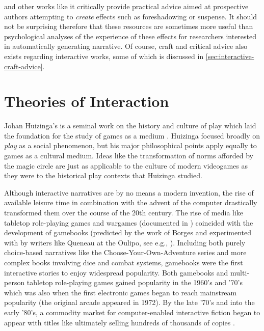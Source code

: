  and other works like it critically provide practical advice aimed at prospective authors attempting to \emph{create} effects such as foreshadowing or suspense.
%
It should not be surprising therefore that these resources are sometimes more useful than psychological analyses of the experience of these effects for researchers interested in automatically generating narrative.
%
Of course, craft and critical advice also exists regarding interactive works, some of which is discussed in \cref{sec:interactive-craft-advice}.


\section{Theories of Interaction}

Johan Huizinga's  is a seminal work on the history and culture of play which laid the foundation for the study of games as a medium \citep{Huizinga1949}.
%
Huizinga focused broadly on \emph{play} as a social phenomenon, but his major philosophical points apply equally to games as a cultural medium.
%
Ideas like the transformation of norms afforded by the magic circle are just as applicable to the culture of modern videogames as they were to the historical play contexts that Huizinga studied.


Although interactive narratives are by no means a modern invention, the rise of available leisure time in combination with the advent of the computer drastically transformed them over the course of the 20th century.
%
The rise of media like tabletop role-playing games and wargames (documented in \citep{Peterson2012}) coincided with the development of gamebooks (predicted by the work of Borges \citep{Borges1956} and experimented with by writers like Queneau at the Oulipo, see e.g., \citep{Queneau1967}).
%
Including both purely choice-based narratives like the Choose-Your-Own-Adventure series and more complex books involving dice and combat systems, gamebooks were the first interactive stories to enjoy widespread popularity.
%
Both gamebooks and multi-person tabletop role-playing games gained popularity in the 1960's and '70's which was also when the first electronic games began to reach mainstream popularity (the original arcade  appeared in 1972).
%
By the late '70's and into the early '80's, a commodity market for computer-enabled interactive fiction began to appear with titles like  ultimately selling hundreds of thousands of copies \citep{Zork}.


